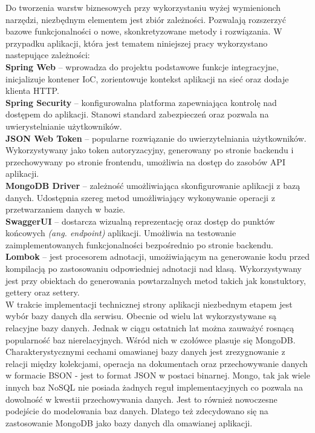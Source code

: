 Do tworzenia warstw biznesowych przy wykorzystaniu wyżej wymienionch narzędzi, niezbędnym elementem jest zbiór zależności. Pozwalają rozszerzyć bazowe funkcjonalności o nowe, skonkretyzowane metody i rozwiązania. W przypadku aplikacji, która jest tematem niniejszej pracy wykorzystano nastepujące zależności:\\
\textbf{Spring Web} -- wprowadza do projektu podstawowe funkcje integracyjne, inicjalizuje kontener IoC, zorientowuje kontekst aplikacji na sieć oraz dodaje klienta HTTP.\\
\textbf{Spring Security} -- konfigurowalna platforma zapewniająca kontrolę nad dostępem do aplikacji. Stanowi standard zabezpieczeń oraz pozwala na uwierystelnianie użytkowników.\\
\textbf{JSON Web Token} -- popularne rozwiązanie do uwierzytelniania użytkowników. Wykorzystywany jako token autoryzacyjny, generowany po stronie backendu i przechowywany po stronie frontendu, umożliwia na dostęp do zasobów API aplikacji.\\
\textbf{MongoDB Driver} -- zależność umożliwiająca skonfigurowanie aplikacji z bazą danych. Udostępnia szereg metod umożliwiający wykonywanie operacji z przetwarzaniem danych w bazie.\\
\textbf{SwaggerUI} -- dostarcza wizualną reprezentację oraz dostęp do punktów końcowych \textit{(ang. endpoint)} aplikacji. Umożliwia na testowanie zaimplementowanych funkcjonalności bezpośrednio po stronie backendu.\\
\textbf{Lombok} -- jest procesorem adnotacji, umożiwiającym na generowanie kodu przed kompilacją po zastosowaniu odpowiedniej adnotacji nad klasą. Wykorzystywany jest przy obiektach do generowania powtarzalnych metod takich jak konstuktory, gettery oraz settery.\\

W trakcie implementacji technicznej strony aplikacji niezbednym etapem jest wybór bazy danych dla serwisu. Obecnie od wielu lat wykorzystywane są relacyjne bazy danych. Jednak w ciągu ostatnich lat można zauważyć rosnącą popularność baz nierelacyjnych. Wśród nich w czołówce plasuje się MongoDB. Charakterystycznymi cechami omawianej bazy danych jest zrezygnowanie z relacji między kolekcjami, operacja na dokumentach oraz przechowywanie danych w formacie BSON - jest to format JSON w postaci binarnej. Mongo, tak jak wiele innych baz NoSQL nie posiada żadnych reguł implementacyjnych co pozwala na dowolność w kwestii przechowywania danych. Jest to również nowoczesne podejście do modelowania baz danych. Dlatego też zdecydowano się na zastosowanie MongoDB jako bazy danych dla omawianej aplikacji.

